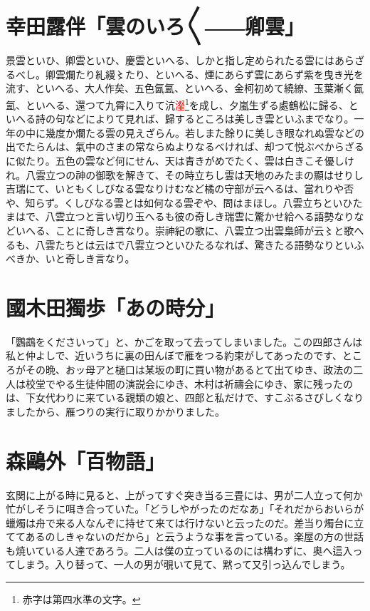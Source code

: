 \documentclass{utarticle}
\begin{document}
\section{幸田露伴「雲のいろ〳〵――卿雲」}

景雲といひ、卿雲といひ、慶雲といへる、しかと指し定められたる雲にはあらざるべし。卿雲爛たり糺縵〻たり、といへる、煙にあらず雲にあらず紫を曳き光を流す、といへる、大人作矣、五色氤氳、といへる、金柯初めて繞繚、玉葉漸く氤氳、といへる、還つて九霄に入りて沆\textcolor{red}{瀣}\footnote{赤字は第四水準の文字。}を成し、夕嵐生ずる處鶴松に歸る、といへる詩の句などによりて見れば、歸するところは美しき雲といふまでなり。一年の中に幾度か爛たる雲の見えざらん。若しまた餘りに美しき眼なれぬ雲などの出でたらんは、氣中のさまの常ならぬよりなるべければ、却つて悦ぶべからざるに似たり。五色の雲など何にせん、天は青きがめでたく、雲は白きこそ優しけれ。八雲立つの神の御歌を解きて、その時立ちし雲は天地のみたまの顯はせりし吉瑞にて、いともくしびなる雲なりけむなど橘の守部が云へるは、當れりや否や、知らず。くしびなる雲とは如何なる雲ぞや、問はまほし。八雲立ちといひたまはで、八雲立つと言い切り玉へるも彼の奇しき瑞雲に驚かせ給へる語勢なりなどいへる、ことに奇しき言なり。崇神紀の歌に、八雲立つ出雲梟師が云〻と歌へるも、八雲たちとは云はで八雲立つといひたるなれば、驚きたる語勢なりといふべきか、いと奇しき言なり。


\section{國木田獨歩「あの時分」}

「鸚鵡をくださいって」と、かごを取って去ってしまいました。この四郎さんは私と仲よしで、近いうちに裏の田んぼで雁をつる約束がしてあったのです、ところがその晩、おッ母アと樋口は某坂の町に買い物があるとて出てゆき、政法の二人は校堂でやる生徒仲間の演説会にゆき、木村は祈禱会にゆき、家に残ったのは、下女代わりに来ている親類の娘と、四郎と私だけで、すこぶるさびしくなりましたから、雁つりの実行に取りかかりました。


\section{森鷗外「百物語」}

玄関に上がる時に見ると、上がってすぐ突き当る三畳には、男が二人立って何か忙がしそうに咡き合っていた。「どうしやがったのだなあ」「それだからおいらが蠟燭は舟で来る人なんぞに持せて来ては行けないと云ったのだ。差当り燭台に立ててあるのしきゃないのだから」と云うような事を言っている。楽屋の方の世話も焼いている人達であろう。二人は僕の立っているのには構わずに、奥へ這入ってしまう。入り替って、一人の男が覗いて見て、黙って又引っ込んでしまう。
\end{document}
